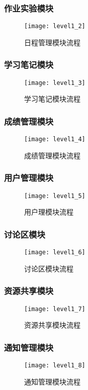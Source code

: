 \subsubsection{作业实验模块}
\begin{figure}[H]
\centering
\texttt{[image: level1\_2]}
\caption{日程管理模块流程}
\end{figure}
\subsubsection{学习笔记模块}
\begin{figure}[H]
\centering
\texttt{[image: level1\_3]}
\caption{学习笔记模块流程}
\end{figure}
\subsubsection{成绩管理模块}
\begin{figure}[H]
\centering
\texttt{[image: level1\_4]}
\caption{成绩管理模块流程}
\end{figure}
\subsubsection{用户管理模块}
\begin{figure}[H]
\centering
\texttt{[image: level1\_5]}
\caption{用户理模块流程}
\end{figure}
\subsubsection{讨论区模块}
\begin{figure}[H]
\centering
\texttt{[image: level1\_6]}
\caption{讨论区模块流程}
\end{figure}
\subsubsection{资源共享模块}
\begin{figure}[H]
\centering
\texttt{[image: level1\_7]}
\caption{资源共享模块流程}
\end{figure}
\subsubsection{通知管理模块}
\begin{figure}[H]
\centering
\texttt{[image: level1\_8]}
\caption{通知管理模块流程}
\end{figure}

